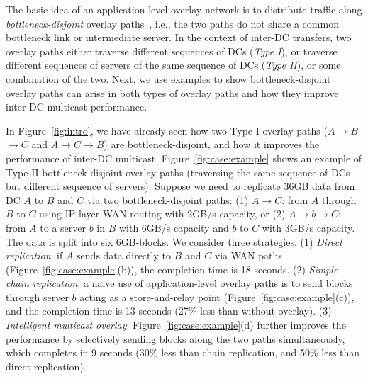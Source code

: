 The basic idea of an application-level overlay network is to
distribute traffic along {\em bottleneck-disjoint} overlay
paths~\cite{datta19951}, i.e., the two paths do not share a common
bottleneck link or intermediate server.
In the context of inter-DC transfers, two overlay paths either
traverse different sequences of DCs ({\em Type I}), or
traverse different sequences of servers of the same sequence of
DCs ({\em Type II}), or some combination of the two.
Next, we use examples to show bottleneck-disjoint overlay paths can
arise in both types of overlay paths and how they improve inter-DC
multicast performance.

In Figure~\ref{fig:intro}, we have already seen how two Type I overlay
paths ($A$$\rightarrow$$B$$\rightarrow$$C$ and
$A$$\rightarrow$$C$$\rightarrow$$B$) are bottleneck-disjoint,
and how it improves the performance of inter-DC multicast.
Figure~\ref{fig:case:example} shows an example
of Type II bottleneck-disjoint overlay paths
(traversing the same sequence of DCs but different sequence of
servers). Suppose we need to replicate 36GB data from DC $A$
to $B$ and $C$ via two bottleneck-disjoint paths:
(1) $A$$\rightarrow$$C$:
from $A$ through $B$ to $C$ using IP-layer WAN routing with
2GB/s capacity, or
(2) $A$$\rightarrow$$b$$\rightarrow$$C$: from $A$ to a server
$b$ in $B$ with
6GB/s capacity and $b$ to $C$ with 3GB/s capacity.
The data is split into six 6GB-blocks.
We consider three strategies.
(1) {\em Direct replication}:
if $A$ sends data directly to $B$ and $C$ via WAN paths
(Figure~\ref{fig:case:example}(b)),
the completion time is 18 seconds.
(2) {\em Simple chain replication}:
a naive use of application-level overlay paths
is to send blocks through server $b$ acting as a
store-and-relay point
(Figure~\ref{fig:case:example}(c)),
and the completion time is 13 seconds (27\% less than without overlay).
(3) {\em Intelligent multicast overlay}:
Figure~\ref{fig:case:example}(d) further improves the performance by
selectively sending blocks along the two paths simultaneously,
which completes in 9 seconds (30\% less than chain replication,
and 50\% less than direct replication).



